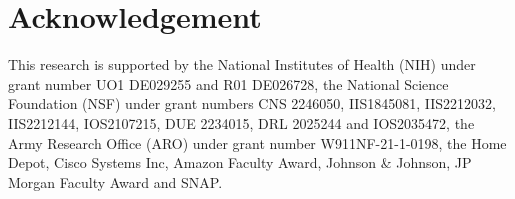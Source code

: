 \section{Acknowledgement}
This research is supported by the National Institutes of Health (NIH) under grant number UO1 DE029255 and R01 DE026728, the National Science Foundation (NSF) under grant numbers CNS 2246050, IIS1845081, IIS2212032, IIS2212144, IOS2107215, DUE 2234015, DRL 2025244 and IOS2035472, the Army Research Office (ARO) under grant number W911NF-21-1-0198, the Home Depot, Cisco Systems Inc, Amazon Faculty Award, Johnson \& Johnson, JP Morgan Faculty Award and SNAP.